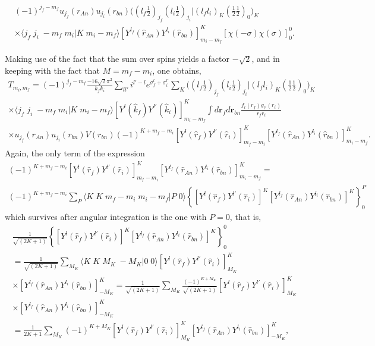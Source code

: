 \begin{multline}\label{eq_onept34}
(-1)^{j_f-m_f}u_{j_f}(r_{An})u_{j_i}(r_{bn})\bigl((l_f \tfrac{1}{2})_{j_f}(l_i \tfrac{1}{2})_{j_i}|(l_f l_i)_K(\tfrac{1}{2} \tfrac{1}{2})_0\bigr)_K\\
 \times\langle j_f\;j_i\;-m_f\;m_i|K\;m_i-m_f\rangle\left[Y^{l_f}(\hat r_{An})  Y^{l_i}(\hat r_{bn}) \right]^{K}_{m_i-m_f}\left[ \chi(-\sigma)\chi(\sigma)\right]^0_0.
\end{multline}

Making use of the fact that the sum over spins yields a factor $-\sqrt{2}$, and in keeping with the fact that $M=m_f-m_i$, one obtains,
\begin{multline}\label{eq_onept14}
T_{m_i,m_f}=(-1)^{j_f-m_f}\frac{-16\sqrt{2}\pi^2}{k_fk_i}\sum_{ll'}i^{l'-l}e^{\sigma_f^l+\sigma_i^{l'}}\sum_K\bigl((l_f \tfrac{1}{2})_{j_f}(l_i \tfrac{1}{2})_{j_i}|(l_f l_i)_K(\tfrac{1}{2} \tfrac{1}{2})_0\bigr)_K\\
\times\langle j_f\;j_i\;-m_f\;m_i|K\;m_i-m_f\rangle\left[ Y^{l} (\hat k_f) Y^{l'} (\hat k_i)\right]^K_{m_i-m_f}\int d\mathbf{r}_fd\mathbf{r}_{bn}\frac{f_l(r_f)g_{l'}(r_i)}{r_fr_i}\\
\times u_{j_f}(r_{An})u_{j_i}(r_{bn})V(r_{bn})
(-1)^{K+m_f-m_i}\left[ Y^{l} (\hat r_f) Y^{l'} (\hat r_i)\right]^K_{m_f-m_i}\left[ Y^{l_f}(\hat r_{An}) Y^{l_i}(\hat r_{bn})\right]^K_{m_i-m_f}.
\end{multline}
Again, the only term of the expression
\begin{multline*}
(-1)^{K+m_f-m_i}\left[ Y^{l} (\hat r_f) Y^{l'} (\hat r_i)\right]^K_{m_f-m_i}\left[ Y^{l_f}(\hat r_{An}) Y^{l_i}(\hat r_{bn})\right]^K_{m_i-m_f}=\\
(-1)^{K+m_f-m_i}\sum_P \langle K\;K\;m_f-m_i\;m_i-m_f|P\;0\rangle\left\{\left[ Y^{l} (\hat r_f) Y^{l'} (\hat r_i)\right]^K\left[ Y^{l_f}(\hat r_{An}) Y^{l_i}(\hat r_{bn})\right]^K\right\}^P_0
\end{multline*}
which survives after angular integration is the one with $P=0$, that is,
\begin{multline*}
\frac{1}{\sqrt{(2K+1)}}\left\{\left[ Y^{l} (\hat r_f) Y^{l'} (\hat r_i)\right]^K\left[ Y^{l_f}(\hat r_{An}) Y^{l_i}(\hat r_{bn})\right]^K\right\}^0_0\\
=\frac{1}{\sqrt{(2K+1)}}\sum_{M_K}\langle K\;K\;M_K\;-M_K|0\;0\rangle\left[ Y^{l} (\hat r_f) Y^{l'} (\hat r_i)\right]^K_{M_K}\\
\times\left[ Y^{l_f}(\hat r_{An}) Y^{l_i}(\hat r_{bn})\right]^K_{-M_K}=\frac{1}{\sqrt{(2K+1)}}\sum_{M_K}\frac{(-1)^{K+M_K}}{\sqrt{(2K+1)}}\left[ Y^{l} (\hat r_f) Y^{l'} (\hat r_i)\right]^K_{M_K}\\
\times\left[ Y^{l_f}(\hat r_{An}) Y^{l_i}(\hat r_{bn})\right]^K_{-M_K}\\
=\frac{1}{2K+1}\sum_{M_K}(-1)^{K+M_K}\left[ Y^{l} (\hat r_f) Y^{l'} (\hat r_i)\right]^K_{M_K}\left[ Y^{l_f}(\hat r_{An}) Y^{l_i}(\hat r_{bn})\right]^K_{-M_K},
\end{multline*}
